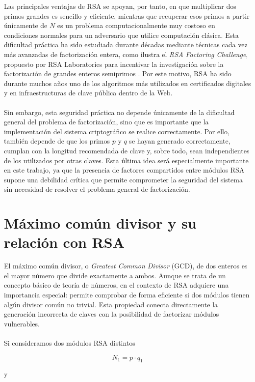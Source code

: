 Las principales ventajas de RSA se apoyan, por tanto, en que multiplicar dos primos grandes es sencillo y eficiente, mientras que recuperar esos primos a partir únicamente de \(N\) es un problema computacionalmente muy costoso en condiciones normales para un adversario que utilice computación clásica. Esta dificultad práctica ha sido estudiada durante décadas mediante técnicas cada vez más avanzadas de factorización entera, como ilustra el \textit{RSA Factoring Challenge}, propuesto por RSA Laboratories para incentivar la investigación sobre la factorización de grandes enteros semiprimos \citep{rivest1978method,rsaChallenge}. Por este motivo, RSA ha sido durante muchos años uno de los algoritmos más utilizados en certificados digitales y en infraestructuras de clave pública dentro de la Web.
\\
\\
Sin embargo, esta seguridad práctica no depende únicamente de la dificultad general del problema de factorización, sino que es importante que la implementación del sistema criptográfico se realice correctamente. Por ello, también depende de que los primos \(p\) y \(q\) se hayan generado correctamente, cumplan con la longitud recomendada de clave y, sobre todo, sean independientes de los utilizados por otras claves. Esta última idea será especialmente importante en este trabajo, ya que la presencia de factores compartidos entre módulos RSA supone una debilidad crítica que permite comprometer la seguridad del sistema sin necesidad de resolver el problema general de factorización.

\section{Máximo común divisor y su relación con RSA}

El máximo común divisor, o \textit{Greatest Common Divisor} (GCD), de dos enteros es el mayor número que divide exactamente a ambos. Aunque se trata de un concepto básico de teoría de números, en el contexto de RSA adquiere una importancia especial: permite comprobar de forma eficiente si dos módulos tienen algún divisor común no trivial. Esta propiedad conecta directamente la generación incorrecta de claves con la posibilidad de factorizar módulos vulnerables.
\\
\\
Si consideramos dos módulos RSA distintos

\[
N_1 = p \cdot q_1
\]

y

